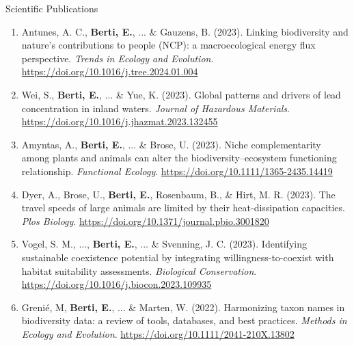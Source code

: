 \documentclass{resume} %
\begin{document}
\begin{rSection}{Scientific Publications}
\begin{enumerate}[leftmargin=0pt]
    \item Antunes, A. C., \textbf{Berti, E.}, ... \& Gauzens, B. (2023). Linking biodiversity and nature’s contributions to people (NCP): a macroecological energy flux perspective. \textit{Trends in Ecology and Evolution}. \url{https://doi.org/10.1016/j.tree.2024.01.004}
    \item Wei, S., \textbf{Berti, E.}, ... \& Yue, K. (2023). Global patterns and drivers of lead concentration in inland waters. \textit{Journal of Hazardous Materials}. \url{https://doi.org/10.1016/j.jhazmat.2023.132455}
    \item Amyntas, A., \textbf{Berti, E.}, ... \& Brose, U. (2023). Niche complementarity among plants and animals can alter the biodiversity–ecosystem functioning relationship. \textit{Functional Ecology}. \url{https://doi.org/10.1111/1365-2435.14419}
    \item Dyer, A., Brose, U., \textbf{Berti, E.}, Rosenbaum, B., \& Hirt, M. R. (2023). The travel speeds of large animals are limited by their heat-dissipation capacities. \textit{Plos Biology}. \url{https://doi.org/10.1371/journal.pbio.3001820}
    \item Vogel, S. M., ..., \textbf{Berti, E.}, ... \& Svenning, J. C. (2023). Identifying sustainable coexistence potential by integrating willingness-to-coexist with habitat suitability assessments. \textit{Biological Conservation}. \url{https://doi.org/10.1016/j.biocon.2023.109935}
    \item Grenié, M, \textbf{Berti, E.}, ... \& Marten, W. (2022). Harmonizing taxon names in biodiversity data: a review of tools, databases, and best practices. \textit{Methods in Ecology and Evolution}. \url{https://doi.org/10.1111/2041-210X.13802}
\end{enumerate}
\end{rSection}
\end{document}
